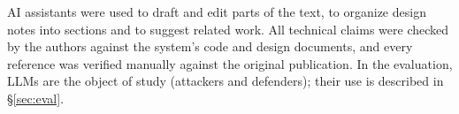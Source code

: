  AI assistants were used to draft and edit parts of the text, to
organize design notes into sections and to suggest related work. All technical claims were
checked by the authors against the system's code and design documents, and every reference was
verified manually against the original publication. In the evaluation, LLMs are the object of
study (attackers and defenders); their use is described in \S\ref{sec:eval}.
